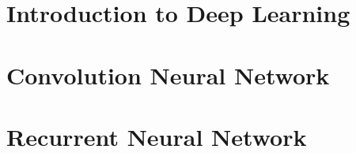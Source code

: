 % 

\section[Intro]{Introduction to Deep Learning}
% 
% 
% 
% 

% 
% 


\section[CNN]{Convolution Neural Network}
% 



\section[RNN]{Recurrent Neural Network}
% 
% 
% 

% 
% 

 
 
% 


